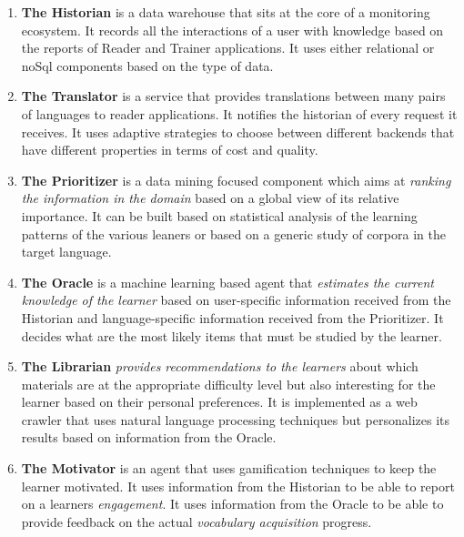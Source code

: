 \newcommand {\archiblock}[1]{\item {\bf #1}}
\begin{enumerate}
	
		\archiblock{The Historian} is a data warehouse that sits at the core of a monitoring ecosystem. It records all the interactions of a user with knowledge based on the reports of Reader and Trainer applications.
		It uses either relational or noSql components based on the type of data.

		\archiblock{The Translator} is a service that provides translations between many pairs of languages to reader applications. It notifies the historian of every request it receives. 
		It uses adaptive strategies to choose between different backends that have different properties in terms of cost and quality.

		\archiblock{The Prioritizer} is a data mining focused component which aims at {\em ranking the information in the domain} based on a global view of its relative importance. It can be built based on statistical analysis of the learning patterns of the various leaners or based on a generic study of corpora in the target language.

		\archiblock{The Oracle} is a machine learning based agent that {\em estimates the current knowledge of the learner} based on user-specific information received from the Historian and language-specific information received from the Prioritizer. It decides what are the most likely items that must be studied by the learner. 

		\archiblock {The Librarian} {\em provides recommendations to the learners} about which materials are at the appropriate difficulty level but also interesting for the learner based on their personal preferences. It is implemented as a web crawler that uses natural language processing techniques but personalizes its results based on  information from the Oracle.

		\archiblock {The Motivator} is an agent that uses gamification techniques to keep the learner motivated. It uses information from the Historian to be able to report on a learners {\em engagement}. It uses information from the Oracle to be able to provide feedback on the actual {\em vocabulary acquisition } progress. 

\end{enumerate}





